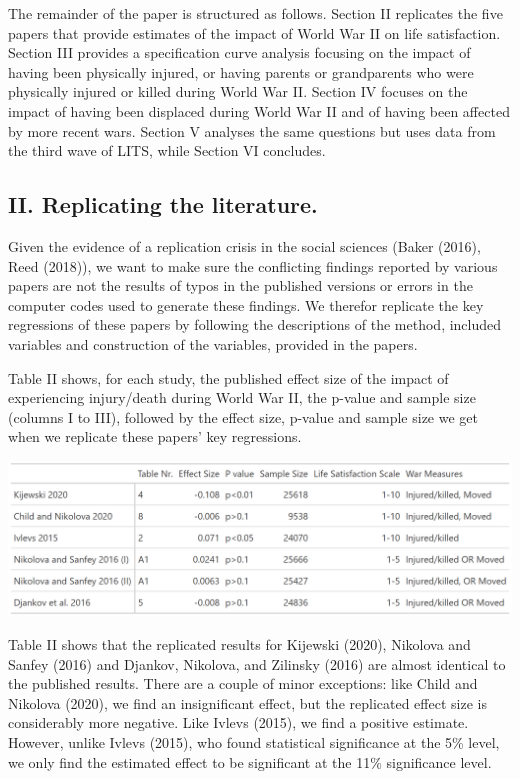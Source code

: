 \documentclass[
  letterpaper,
  DIV=11,
  numbers=noendperiod]{scrartcl}
\begin{document}
The remainder of the paper is structured as follows. Section II
replicates the five papers that provide estimates of the impact of World
War II on life satisfaction. Section III provides a specification curve
analysis focusing on the impact of having been physically injured, or
having parents or grandparents who were physically injured or killed
during World War II. Section IV focuses on the impact of having been
displaced during World War II and of having been affected by more recent
wars. Section V analyses the same questions but uses data from the third
wave of LITS, while Section VI concludes.

\hypertarget{ii.-replicating-the-literature.}{%
\subsection{II. Replicating the
literature.}\label{ii.-replicating-the-literature.}}

Given the evidence of a replication crisis in the social sciences (Baker
(2016), Reed (2018)), we want to make sure the conflicting findings
reported by various papers are not the results of typos in the published
versions or errors in the computer codes used to generate these
findings. We therefor replicate the key regressions of these papers by
following the descriptions of the method, included variables and
construction of the variables, provided in the papers.

Table II shows, for each study, the published effect size of the impact
of experiencing injury/death during World War II, the p-value and sample
size (columns I to III), followed by the effect size, p-value and sample
size we get when we replicate these papers' key regressions.

\includegraphics{tab_1.png}

Table II shows that the replicated results for Kijewski (2020), Nikolova
and Sanfey (2016) and Djankov, Nikolova, and Zilinsky (2016) are almost
identical to the published results. There are a couple of minor
exceptions: like Child and Nikolova (2020), we find an insignificant
effect, but the replicated effect size is considerably more negative.
Like Ivlevs (2015), we find a positive estimate. However, unlike Ivlevs
(2015), who found statistical significance at the 5\% level, we only
find the estimated effect to be significant at the 11\% significance
level.
\end{document}
